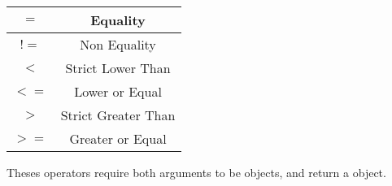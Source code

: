 \begin{tabular}{|c|c|}
\hline
$=$ & Equality \\
\hline
$!=$ & Non Equality \\
\hline
$<$  & Strict Lower Than \\
\hline
$<=$  & Lower or Equal \\
\hline
$>$  & Strict Greater Than \\
\hline
$>=$  & Greater or Equal \\
\hline
\end{tabular}

Theses operators require both arguments to be  objects, and return a  object.
